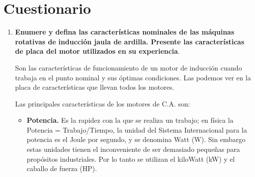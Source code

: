 \documentclass[a4paper,11pt]{article}
\begin{document}
\section{Cuestionario}
\begin{enumerate}
    \item \textbf{Enumere y defina las características nominales de las máquinas rotativas de inducción jaula de ardilla. Presente las características de placa del motor utilizados en su experiencia}.
    
    Son las características de funcionamiento de un motor de inducción cuando trabaja en el punto nominal y sus óptimas condiciones. Las podemos ver en la placa de características que llevan todos los motores.
    
    Las principales características de los motores de C.A. son:
    \begin{itemize}
        \item \textbf{Potencia.} Es la rapidez con la que se realiza un trabajo; en física la Potencia = Trabajo/Tiempo, la unidad del Sistema Internacional para la potencia es el Joule por segundo, y se denomina Watt (W). Sin embargo estas unidades tienen el inconveniente de ser demasiado pequeñas para propósitos industriales. Por lo tanto se utilizan el kiloWatt (kW) y el caballo de fuerza (HP).
        

\end{itemize}
\end{enumerate}
\end{document}
